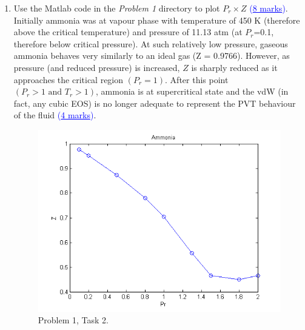 \documentclass[12pts,a4paper,amsmath,amssymb,floatfix]{article}%
\newcommand{\blue}{\textcolor{blue}}
\begin{document}
\begin{enumerate}[label=\bfseries Problem \arabic*:]
\begin{enumerate}[label=\bfseries Task \arabic*:]
          \item Use the Matlab code in the {\it Problem 1} directory to plot $P_{r}\times Z$ \blue{(\underline{8 marks})}.  Initially ammonia was at vapour phase with temperature of 450 K (therefore above the critical temperature) and pressure of 11.13 atm (at $P_{r}$=0.1, therefore below critical pressure). At such relatively low pressure, gaseous ammonia behaves very similarly to an ideal gas (Z = 0.9766). However, as pressure (and reduced pressure) is increased, $Z$ is sharply reduced as it approaches the critical region $\left(P_{r}=1\right)$. After this point $\left(P_{r}>1\text{ and }T_{r}>1\right)$, ammonia is at supercritical state and the vdW (in fact, any cubic EOS) is no longer adequate to represent the PVT behaviour of the fluid \blue{(\underline{4 marks})}.
            \begin{figure}[h]
               \begin{center}
                   \includegraphics[width=12.cm,height=8.cm,clip]{./Figs/NH3.png}
               \end{center}
               \caption{Problem 1, Task 2. }
               \label{Prob2_Task2}
            \end{figure}

      \end{enumerate} 

\clearpage


\end{enumerate}
\end{document}

